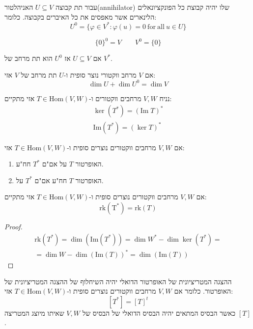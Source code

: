 \documentclass{tstextbook}
\begin{document}
\begin{definition}[אניהלטור]
עבור תת קבוצה \(U\subseteq V\) האניהלטור(annihilator) שלו יהיה קבוצת כל הפונקציונאלים הלינארים אשר מאפסים את כל האיברים בקבוצה. כלומר:
$$U^{0}=\{\varphi\in V^*:\varphi(u)=0{\mathrm{~for~all~}}u\in U\}$$

\end{definition}
\begin{example}
$$\{ 0 \}^{0}=V\quad \quad V^{0}=\{ 0 \}$$

\end{example}
\begin{proposition}
אם \(U\subseteq V\) אז \(U^{0}\) הוא תת מרחב של \(V^{*}\).

\end{proposition}
\begin{proposition}
אם \(V\) מרחב ווקטורי נוצר סופית ו-\(U\) תת מרחב של \(V\) אזי:
$$\dim U+\dim U^{0}=\dim V$$

\end{proposition}
\begin{proposition}
נניח \(V,W\) מרחבים ווקטורים ו-\(T \in \mathrm{Hom}(V,W)\) אזי מתקיים:
\begin{gather*}\ker (T^{*})=\left( \mathrm{Im}\;T \right)^{*} \\\mathrm{Im}(T^{*})=\left( \ker T \right)^{*}
\end{gather*}

\end{proposition}
\begin{proposition}
אם \(V,W\) מרחבים ווקטורים נוצרים סופית ו-\(T \in \mathrm{Hom}(V,W)\) אזי:

  \begin{enumerate}
    \item האופרטור \(T\) על אם"ם \(T^{*}\) חח"ע. 


    \item האופרטור \(T\) חח"ע אם"ם \(T^{*}\) על. 


  \end{enumerate}
\end{proposition}
\begin{proposition}
אם \(V,W\) מרחבים ווקטורים נוצרים סופית ו-\(T \in \mathrm{ Hom}(V,W)\) אזי מתקיים:
$$\mathrm{rk(T^{*})}=\mathrm{rk}(T)$$

\end{proposition}
\begin{proof}
\begin{gather*}\mathrm{rk}(T^{*})=\dim \left( \mathrm{Im}(T^{*}) \right)=\dim  W^{*}-\dim  \ker (T^{*}) = \\=\dim  W - \dim \left( \mathrm{Im}(T) \right)^{*}=\dim \left( \mathrm{Im}(T) \right) 
\end{gather*}

\end{proof}
\begin{proposition}
ההצגה המטריציונית של האופרטור הדואלי יהיה השיחלוף של ההצגה המטריציונית של האופרטור. כלומר אם \(V,W\) מרחבים ווקטורים נוצרים סופית ו-\(T \in \mathrm{Hom}(V,W)\) אזי:
$$[T^{*}]=[T]^{t}$$
כאשר הבסיס המתאים יהיה הבסיס הדואלי של הבסיס של \(V,W\) שאיתו מיוצג המטריצה \([T]\).

\end{proposition}
\end{document}
